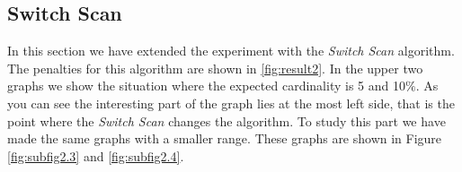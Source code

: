 \documentclass[a4paper,11pt,twoside]{article}
\begin{document}
\subsection{Switch Scan}
In this section we have extended the experiment with the \textit{Switch Scan} algorithm. The penalties for this algorithm are shown in \autoref{fig:result2}. In the upper two graphs we show the situation where the expected cardinality is 5 and 10$\%$. As you can see the interesting part of the graph lies at the most left side, that is the point where the \textit{Switch Scan} changes the algorithm. To study this part we have made the same graphs with a smaller range. These graphs are shown in Figure \autoref{fig:subfig2.3} and \autoref{fig:subfig2.4}.\\


\begin{figure}[ht!]
\centering
{}
\quad
{}


\end{figure}
\end{document}
